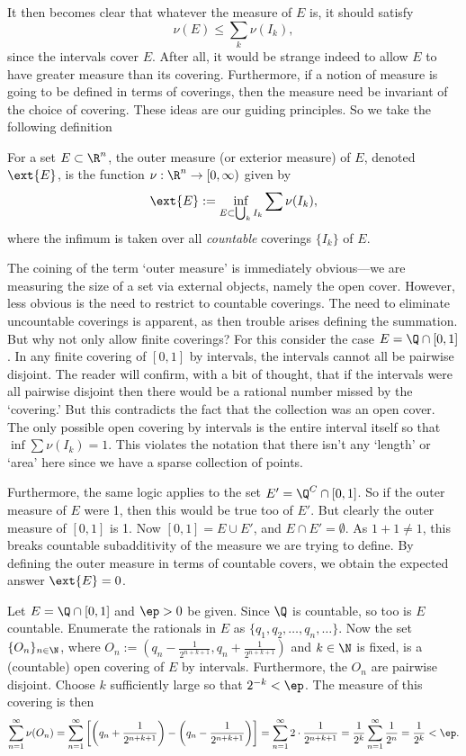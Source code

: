 It then becomes clear that whatever the measure of $E$ is, it should satisfy
	\[
	\nu(E) \leq \sum_k \nu(I_k),
	\]
since the intervals cover $E$. After all, it would be strange indeed to allow $E$ to have greater measure than its covering. Furthermore, if a notion of measure is going to be defined in terms of coverings, then the measure need be invariant of the choice of covering. These ideas are our guiding principles. So we take the following definition 


\begin{dfn}
For a set $E \subset \R^n$, the outer measure (or exterior measure) of $E$, denoted $\ext{E}$, is the function $\nu: \R^n \to [0,\infty)$ given by
	\[
	\ext{E}:= \inf_{E \subset \bigcup_k I_k} \sum \nu(I_k),
	\]
where the infimum is taken over all \emph{countable} coverings $\{I_k\}$ of $E$. 
\end{dfn}


The coining of the term `outer measure' is immediately obvious---we are measuring the size of a set via external objects, namely the open cover. However, less obvious is the need to restrict to countable coverings. The need to eliminate uncountable coverings is apparent, as then trouble arises defining the summation. But why not only allow finite coverings? For this consider the case $E= \Q \cap [0,1]$. In any finite covering of $[0,1]$ by intervals, the intervals cannot all be pairwise disjoint. The reader will confirm, with a bit of thought, that if the intervals were all pairwise disjoint then there would be a rational number missed by the `covering.' But this contradicts the fact that the collection was an open cover. The only possible open covering by intervals is the entire interval itself so that $\inf \sum \nu(I_k)=1$. This violates the notation that there isn't any `length' or `area' here since we have a sparse collection of points. 


Furthermore, the same logic applies to the set $E'=\Q^C \cap [0,1]$. So if the outer measure of $E$ were 1, then this would be true too of $E'$. But clearly the outer measure of $[0,1]$ is 1. Now $[0,1]=E \cup E'$, and $E \cap E'=\emptyset$. As $1+1 \neq 1$, this breaks countable subadditivity of the measure we are trying to define. By defining the outer measure in terms of countable covers, we obtain the expected answer $\ext{E}=0$. 


\begin{ex}
Let $E=\Q \cap [0,1]$ and $\ep>0$ be given. Since $\Q$ is countable, so too is $E$ countable. Enumerate the rationals in $E$ as $\{q_1,q_2,\ldots,q_n,\ldots\}$. Now the set $\{O_n\}_{n \in \N}$, where $O_n:= (q_n- \frac{1}{2^{n+k+1}}, q_n+\frac{1}{2^{n+k+1}})$ and $k \in \N$ is fixed, is a (countable) open covering of $E$ by intervals. Furthermore, the $O_n$ are pairwise disjoint. Choose $k$ sufficiently large so that $2^{-k}<\ep$. The measure of this covering is then
	\[
	\sum_{n=1}^\infty \nu(O_n)= \sum_{n=1}^\infty \left[ \left(q_n+\frac{1}{2^{n+k+1}}\right) - \left(q_n- \frac{1}{2^{n+k+1}}\right) \right]= \sum_{n=1}^\infty 2 \cdot \dfrac{1}{2^{n+k+1}}= \dfrac{1}{2^k} \sum_{n=1}^\infty \dfrac{1}{2^n}= \dfrac{1}{2^k}<\ep.
	\] \xqed
\end{ex}


